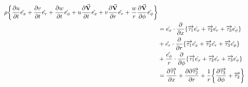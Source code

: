 \begin{equation}
  \begin{aligned}
  \rho \bigg\{ 
      \pdv{u}{t}\hat{e_x} 
    + \pdv{v}{t}\hat{e_r}
    + \pdv{w}{t}\hat{e_\phi} 
    + u\pdv{\va{V}}{t}\hat{e_x}
    + v\pdv{\va{V}}{r}\hat{e_r}
    + \frac{w}{r}\pdv{\va{V}}{\phi}\hat{e_\phi}
  \bigg\} \\
  &= \hat{e_x}\cdot\pdv{x}
  \{
      \overrightarrow{\tau_1}\hat{e_x}
    + \overrightarrow{\tau_2}\hat{e_r}
    + \overrightarrow{\tau_3}\hat{e_\phi}
  \} \\
  &+ \hat{e_r}\cdot\pdv{r}
  \{
      \overrightarrow{\tau_1}\hat{e_x}
    + \overrightarrow{\tau_2}\hat{e_r}
    + \overrightarrow{\tau_3}\hat{e_\phi}
  \} \\
  &+ \frac{\hat{e_\phi}}{r}\cdot\pdv{\phi}
  \{
      \overrightarrow{\tau_1}\hat{e_x}
    + \overrightarrow{\tau_2}\hat{e_r}
    + \overrightarrow{\tau_3}\hat{e_\phi}
  \} \\
  &= \pdv{\overrightarrow{\tau_1}}{x} 
    + \pdv{\partial\overrightarrow{\tau_2}}{r} 
    + \frac{1}{r} 
    \bigg\{
      \pdv{\overrightarrow{\tau_3}}{\phi}  
      + \overrightarrow{\tau_2}
    \bigg\}
  \end{aligned}
\end{equation}

